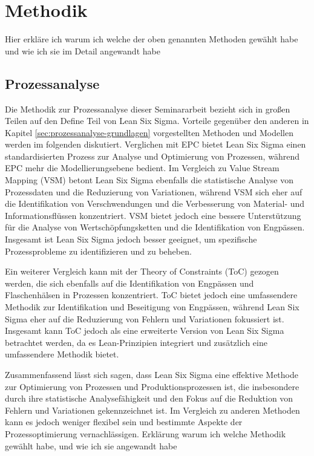 \documentclass[11pt,a4paper]{scrartcl}
\begin{document}
\section{Methodik}\label{sec:methodik}
Hier erkläre ich warum ich welche der oben genannten Methoden gewählt habe und wie ich sie im Detail angewandt habe
\subsection{Prozessanalyse}\label{subsec:prozessanalyse-methodik}
Die Methodik zur Prozessanalyse dieser Seminararbeit bezieht sich in großen Teilen auf den Define Teil von Lean Six Sigma.
Vorteile gegenüber den anderen in Kapitel \ref{sec:prozessanalyse-grundlagen} vorgestellten Methoden und Modellen werden im folgenden diskutiert.
Verglichen mit EPC bietet Lean Six Sigma einen standardisierten Prozess zur Analyse und Optimierung von Prozessen, während EPC mehr die Modellierungsebene bedient.
Im Vergleich zu Value Stream Mapping (VSM) betont Lean Six Sigma ebenfalls die statistische Analyse von Prozessdaten und die Reduzierung von Variationen, während VSM sich eher auf die Identifikation von Verschwendungen und die Verbesserung von Material- und Informationsflüssen konzentriert. VSM bietet jedoch eine bessere Unterstützung für die Analyse von Wertschöpfungsketten und die Identifikation von Engpässen. Insgesamt ist Lean Six Sigma jedoch besser geeignet, um spezifische Prozessprobleme zu identifizieren und zu beheben.

Ein weiterer Vergleich kann mit der Theory of Constraints (ToC) gezogen werden, die sich ebenfalls auf die Identifikation von Engpässen und Flaschenhälsen in Prozessen konzentriert. ToC bietet jedoch eine umfassendere Methodik zur Identifikation und Beseitigung von Engpässen, während Lean Six Sigma eher auf die Reduzierung von Fehlern und Variationen fokussiert ist. Insgesamt kann ToC jedoch als eine erweiterte Version von Lean Six Sigma betrachtet werden, da es Lean-Prinzipien integriert und zusätzlich eine umfassendere Methodik bietet.

Zusammenfassend lässt sich sagen, dass Lean Six Sigma eine effektive Methode zur Optimierung von Prozessen und Produktionsprozessen ist, die insbesondere durch ihre statistische Analysefähigkeit und den Fokus auf die Reduktion von Fehlern und Variationen gekennzeichnet ist. Im Vergleich zu anderen Methoden kann es jedoch weniger flexibel sein und bestimmte Aspekte der Prozessoptimierung vernachlässigen.
Erklärung warum ich welche Methodik gewählt habe, und wie ich sie angewandt habe
\end{document}
